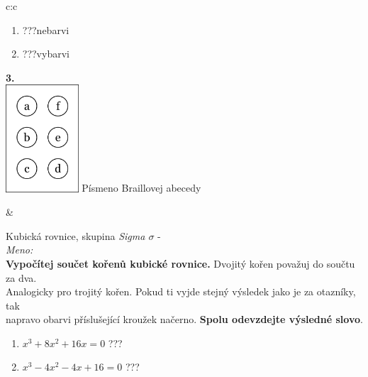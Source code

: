 \documentclass[10pt]{report}
\begin{document}
\begin{tabular}{c:c}
\begin{minipage}[c][99mm][t]{0.49\linewidth}
\begin{center}
\begin{minipage}{0.77\linewidth}
\begin{center}
\begin{varwidth}{\textwidth}
\begin{enumerate}
\item \quad \dotfill\; ???\;\dotfill \quad nebarvi
\item \quad \dotfill\; ???\;\dotfill \quad vybarvi
\end{enumerate}
\end{varwidth}
\end{center}
\end{minipage}
\begin{minipage}{0.20\linewidth}
\begin{center}
{\Huge\bfseries 3.} \\[2mm]
\includegraphics[height=40mm]{../images/braille.png}
{\small Písmeno Braillovej abecedy}
\end{center}
\end{minipage}
\end{center}
\end{minipage}
&
\begin{minipage}[c][99mm][t]{0.49\linewidth}
\begin{center}
\vspace{7mm}
{\huge Kubická rovnice, skupina \textit{Sigma $\sigma$} -}\\[4.5mm]
\textit{Meno:}\phantom{xxxxxxxxxxxxxxxxxxxxxxxxxxxxxxxxxxxxxxxxxxxxxxxxxxxxxxxxxxxxxxxxx}\\[3.5mm]
\textbf{Vypočítej součet kořenů kubické rovnice.} Dvojitý kořen považuj do součtu za dva.\\Analogicky pro trojitý kořen. Pokud ti vyjde stejný výsledek jako je za otazníky, tak\\napravo obarvi příslušející kroužek načerno. \textbf{Spolu odevzdejte výsledné slovo}.\\[3mm]
\begin{minipage}{0.77\linewidth}
\begin{center}
\begin{varwidth}{\textwidth}
\begin{enumerate}
\large
\item $x^3+8x^2+16x=0$\quad \dotfill\; ???\;\dotfill {}
\item $x^3-4x^2-4x+16=0$\quad \dotfill\; ???\;\dotfill {}

\end{enumerate}
\end{varwidth}
\end{center}
\end{minipage}
\end{center}
\end{minipage}
\end{tabular}
\end{document}

